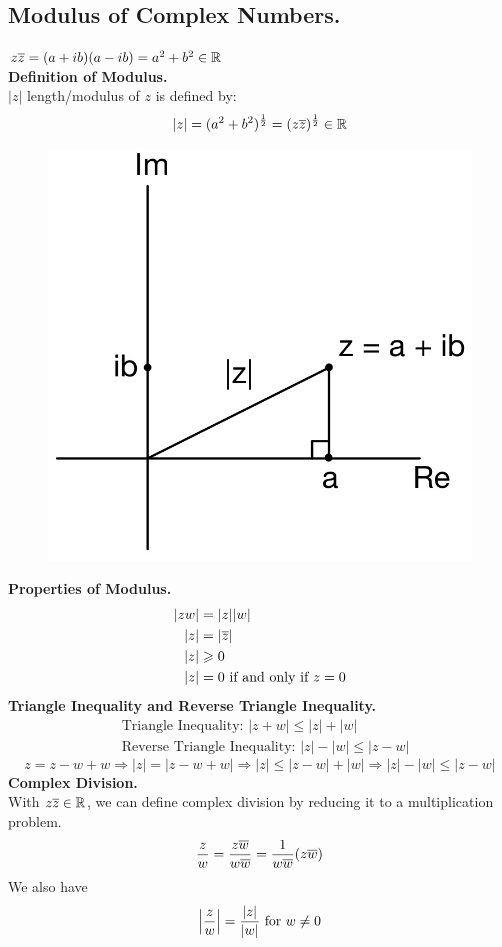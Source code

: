 \documentclass[11pt]{article}
\DeclarePairedDelimiter\abs{\lvert}{\rvert}
\begin{document}
\subsection{Modulus of Complex Numbers.}
$z\overline{z} = (a + ib)(a - ib) = a^2 + b^2 \in \mathbb{R}$  \\

\textbf{Definition of Modulus.} \\
$|z|$ length/modulus of $z$ is defined by:
$$|z| = (a^2 + b^2)^{\frac{1}{2}} = (z\overline{z})^{\frac{1}{2}} \in \mathbb{R}$$
\begin{figure}[H]
\includegraphics[scale = 0.19]{1_3}
\centering
\end{figure}
\textbf{Properties of Modulus.} 
\begin {align*}
|zw| &= |z||w| \\
|z| &= |\overline{z}| \\  
|z| &\geqslant 0 \\
|z| &= 0 \text{ if and only if } z = 0
\end{align*}
\newline
\textbf{Triangle Inequality and Reverse Triangle Inequality.}
\begin{align*}
      &\text{Triangle Inequality: } |z + w| \leqslant |z| + |w| \\
      &\text{Reverse Triangle Inequality: }|z| - |w| \leqslant |z - w|
\end{align*}
$$z = z - w + w \Rightarrow |z| = |z - w + w| \Rightarrow |z| \leqslant |z - w| + |w| \Rightarrow |z| - |w| \leqslant |z - w|$$
\newline
\textbf{Complex Division.} \\
With $z\overline{z} \in \mathbb{R}$, we can define complex division by reducing it to a multiplication problem. 
$$\frac{z}{w} = \frac{z\overline{w}}{w\overline{w}} = \frac{1}{w\overline{w}}(z\overline{w})$$ 
We also have 
\begin{equation*} 
\abs[\Big]{\frac{z}{w}} = \frac{|z|}{|w|} \mbox{ for } w \neq 0 
\end{equation*}
\end{document}
